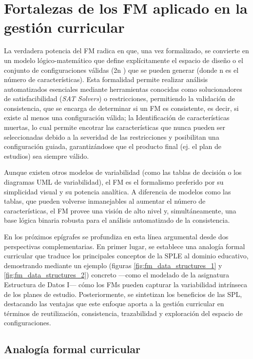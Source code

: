 \section{Fortalezas de los \ac{FM} aplicado en la gestión curricular}

La verdadera potencia del \ac{FM} radica en que, una vez formalizado,
se convierte en un modelo lógico-matemático que define explícitamente
el espacio de diseño o el conjunto de configuraciones válidas (2n ) que se
pueden generar (donde n es el número de características). Esta formalidad 
permite realizar análisis automatizados esenciales mediante herramientas 
conocidas como solucionadores de satisfacibilidad (\textit{SAT Solvers}) o
restricciones, permitiendo la validación de consistencia, que se encarga 
de determinar si un \ac{FM} es consistente, es decir, si existe al menos
una configuración válida; la Identificación de características muertas, 
lo cual permite encotrar las características que nunca pueden ser seleccionadas debido 
a la severidad de las restricciones y posibilitan una configuración guiada, garantizándose
que el producto final (ej. el plan de estudios) sea siempre válido.

Aunque existen otros modelos de variabilidad (como las tablas de
decisión o los diagramas UML de variabilidad), el \ac{FM} es el formalismo
preferido por su simplicidad visual y su potencia analítica. A diferencia
de modelos como las tablas, que pueden volverse inmanejables al aumentar 
el número de características, el \ac{FM} provee una visión de alto
nivel y, simultáneamente, una base lógica binaria robusta para el análisis 
automatizado de la consistencia.

En los próximos epígrafes se profundiza en esta línea argumental desde dos 
perspectivas complementarias. En primer lugar, se establece una analogía formal 
curricular que traduce los principales conceptos de la \ac{SPLE} al dominio educativo, 
demostrando mediante un ejemplo (figuras \ref{fig:fm_data_structures_1} y \ref{fig:fm_data_structures_2}) 
concreto —como el modelado de la asignatura Estructura de Datos I— 
cómo los \ac{FM}s pueden capturar la variabilidad intrínseca de los planes de estudio. 
Posteriormente, se sintetizan los beneficios de las \ac{SPL}, 
destacando las ventajas que este enfoque aporta a la gestión curricular en términos de 
reutilización, consistencia, trazabilidad y exploración del espacio de configuraciones.
 

\subsection{Analogía formal curricular}

